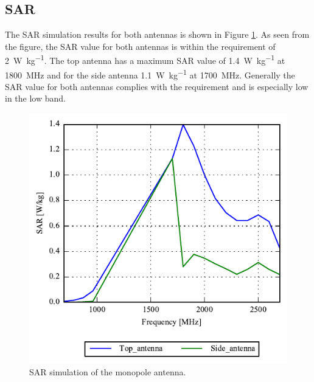 \FloatBarrier
\subsection{SAR}
The SAR simulation results for both antennas is shown in Figure \ref{fig:sol1_sar}. As seen from the figure, the SAR value for both antennas is within the requirement of \SI{2}{W\per kg}. The top antenna has a maximum SAR value of \SI{1.4}{W\per kg} at \SI{1800}{MHz} and for the side antenna \SI{1.1}{W\per kg} at \SI{1700}{MHz}. Generally the SAR value for both antennas complies with the requirement and is especially low in the low band.
\begin{figure}[htbp]
    \centering
    \includegraphics{img/tech_sol/monopole/sar/Top_antenna.pdf}
    \caption{SAR simulation of the monopole antenna.}
    \label{fig:sol1_sar}
\end{figure}

